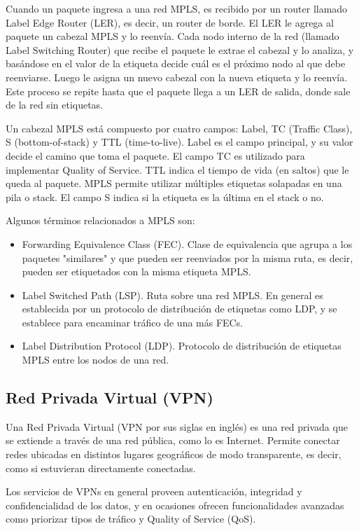 Cuando un paquete ingresa a una red MPLS, es recibido por un router llamado Label Edge Router (LER), es decir, un router de borde. El LER le agrega al paquete un cabezal MPLS y lo reenvía. Cada nodo interno de la red (llamado Label Switching Router) que recibe el paquete le extrae el cabezal y lo analiza, y basándose en el valor de la etiqueta decide cuál es el próximo nodo al que debe reenviarse. Luego le asigna un nuevo cabezal con la nueva etiqueta y lo reenvía. Este proceso se repite hasta que el paquete llega a un LER de salida, donde sale de la red sin etiquetas.

Un cabezal MPLS está compuesto por cuatro campos: Label, TC (Traffic Class), S (bottom-of-stack) y TTL (time-to-live). Label es el campo principal, y su valor decide el camino que toma el paquete. El campo TC es utilizado para implementar Quality of Service. TTL indica el tiempo de vida (en saltos) que le queda al paquete. MPLS permite utilizar múltiples etiquetas solapadas en una pila o stack. El campo S indica si la etiqueta es la última en el stack o no.

Algunos términos relacionados a MPLS son:
\begin{itemize}
	\item Forwarding Equivalence Class (FEC). Clase de equivalencia que agrupa a los paquetes "similares" y que pueden ser reenviados por la misma ruta, es decir, pueden ser etiquetados con la misma etiqueta MPLS.
	\item Label Switched Path (LSP). Ruta sobre una red MPLS. En general es establecida por un protocolo de distribución de etiquetas como LDP, y se establece para encaminar tráfico de una más FECs.
	\item Label Distribution Protocol (LDP). Protocolo de distribución de etiquetas MPLS entre los nodos de una red.
\end{itemize}

\subsection{Red Privada Virtual (VPN)}
Una Red Privada Virtual (VPN por sus siglas en inglés) es una red privada que se extiende a través de una red pública, como lo es Internet. Permite conectar redes ubicadas en distintos lugares geográficos de modo transparente, es decir, como si estuvieran directamente conectadas.

Los servicios de VPNs en general proveen autenticación, integridad y confidencialidad de los datos, y en ocasiones ofrecen funcionalidades avanzadas como priorizar tipos de tráfico y Quality of Service (QoS).


